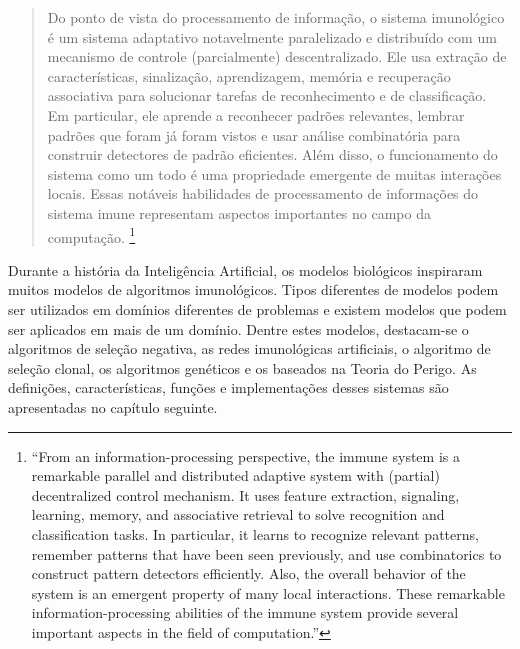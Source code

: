 \begin{quote}
    Do ponto de vista do processamento de informação, o sistema imunológico é um sistema adaptativo notavelmente paralelizado e distribuído com um mecanismo de controle (parcialmente) descentralizado. Ele usa extração de características, sinalização, aprendizagem, memória e recuperação associativa para solucionar tarefas de reconhecimento e de classificação. Em particular, ele aprende a reconhecer padrões relevantes, lembrar padrões que foram já foram vistos e usar análise combinatória para construir detectores de padrão eficientes. Além disso, o funcionamento do sistema como um todo é uma propriedade emergente de muitas interações locais. Essas notáveis habilidades de processamento de informações do sistema imune representam aspectos importantes no campo da computação. \cite{Dasgupta2006}\footnote{``From an information-processing perspective, the immune system is a remarkable parallel and distributed adaptive system with (partial) decentralized control mechanism. It uses feature extraction, signaling, learning, memory, and associative retrieval to solve recognition and classification tasks. In particular, it learns to recognize relevant patterns, remember patterns that have been seen previously, and use combinatorics to construct pattern detectors efficiently. Also, the overall behavior of the system is an emergent property of many local interactions. These remarkable information-processing abilities of the immune system provide several important aspects in the field of computation.''\cite{Dasgupta2006}}
\end{quote}

Durante a história da Inteligência Artificial, os modelos biológicos inspiraram muitos modelos de algoritmos imunológicos. Tipos diferentes de modelos podem ser utilizados em domínios diferentes de problemas e existem modelos que podem ser aplicados em mais de um domínio. Dentre estes modelos, destacam-se o algoritmos de seleção negativa, as redes imunológicas artificiais, o algoritmo de seleção clonal, os algoritmos genéticos e os baseados na Teoria do Perigo. As definições, características, funções e implementações desses sistemas são apresentadas no capítulo seguinte.
